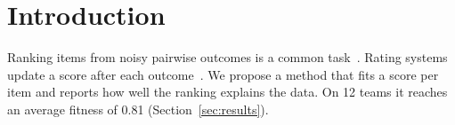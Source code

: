 \section{Introduction}
\label{sec:intro}

Ranking items from noisy pairwise outcomes is a common task~\cite{Bradley1952}.
Rating systems update a score after each outcome~\cite{Elo1978}.
We propose a method that fits a score per item and reports how well the ranking explains the data.
On 12 teams it reaches an average fitness of 0.81 (Section~\ref{sec:results}).
